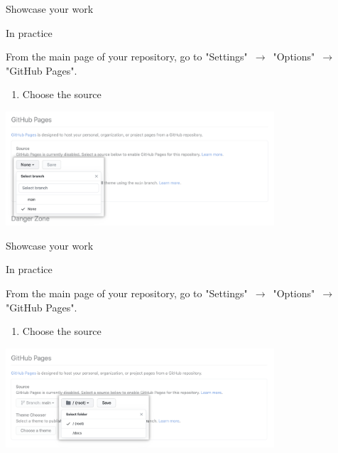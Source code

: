 \begin{frame}{Showcase your work}

In practice

From the main page of your repository, go to "Settings" $\,\to\,$ "Options" $\,\to\,$ "GitHub Pages".

\begin{enumerate}
    \item Choose the source
\end{enumerate}

\begin{center}
    \includegraphics[width=10cm]{08_sharing/images/github_pages_settings_branch.png}
\end{center}

\end{frame}

\begin{frame}{Showcase your work}

In practice

From the main page of your repository, go to "Settings" $\,\to\,$ "Options" $\,\to\,$ "GitHub Pages".

\begin{enumerate}
    \item Choose the source
\end{enumerate}

\begin{center}
    \includegraphics[width=10cm]{08_sharing/images/github_pages_settings_folder.png}
\end{center}

\end{frame}

